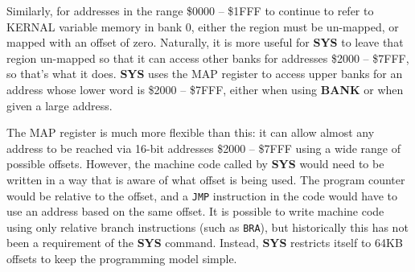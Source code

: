 Similarly, for addresses in the range \$0000 -- \$1FFF to continue to refer to KERNAL variable memory in bank 0, either the region must be un-mapped, or mapped with an offset of zero. Naturally, it is more useful for {\bf SYS} to leave that region un-mapped so that it can access other banks for addresses \$2000 -- \$7FFF, so that's what it does. {\bf SYS} uses the MAP register to access upper banks for an address whose lower word is \$2000 -- \$7FFF, either when using {\bf BANK} or when given a large address.

The MAP register is much more flexible than this: it can allow almost any address to be reached via 16-bit addresses \$2000 -- \$7FFF using a wide range of possible offsets. However, the machine code called by {\bf SYS} would need to be written in a way that is aware of what offset is being used. The program counter would be relative to the offset, and a {\tt JMP} instruction in the code would have to use an address based on the same offset. It is possible to write machine code using only relative branch instructions (such as {\tt BRA}), but historically this has not been a requirement of the {\bf SYS} command. Instead, {\bf SYS} restricts itself to 64KB offsets to keep the programming model simple.
